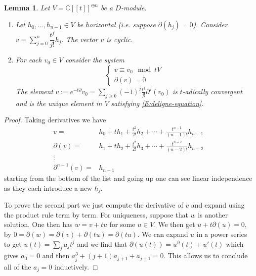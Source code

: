 \documentclass[]{book}
\numberwithin{equation}{section}
\newtheorem{lemma}[theorem]{Lemma}
\theoremstyle{definition}
\theoremstyle{remark}
\newcommand{\CC}{\mathbb{C}}
\begin{document}
\begin{lemma}\label{L:katz}
	Let $V=\CC[[t]]^{\oplus n}$ be a $D$-module. 
	\begin{enumerate}
		\item Let $h_0,\ldots,h_{n-1} \in V$ be horizontal (i.e. suppose $\partial(h_j)=0$). 
		Consider  $v=\sum_{j=0}^n \dfrac{t^j}{j!}h_j.$
		The vector $v$ is cyclic. 
		\item For each $v_0\in V$ consider the system 
		\begin{equation}\label{E:deligne-equation}
		\begin{cases}
		v \equiv v_0 \mod tV \\
		\partial(v) =0 
		\end{cases}
		\end{equation}
		The element  $v:= e^{-t\partial}v_0 = \sum_{j\geq 0}(-1)^j \frac{t^j}{j!}\partial^j(v_0)$
		is $t$-adically convergent and is the unique element in $V$ satisfying \eqref{E:deligne-equation}.
	\end{enumerate}
\end{lemma}
\begin{proof}
	Taking derivatives we have 
	\begin{align*}
	v=& h_0 + t h_1 + \frac{t^2}{2!} h_2 + \cdots + \frac{t^{n-1}}{(n-1)!}h_{n-1}\\
	\partial(v) =& h_1 + t h_2 + \frac{t^2}{2!} h_3+ \cdots + \frac{t^{n-2}}{(n-2)!}h_{n-2} \\
	\vdots & \\
	\partial^{n-1}(v) =& h_{n-1}
	\end{align*}
	starting from the bottom of the list and going up one can see linear independence as they each introduce a new $h_j$.
	
	To prove the second part we just compute the derivative of $v$ and expand using the product rule term by term. 
	For uniqueness, suppose that $w$ is another solution. 
	One then has $w=v+tu$ for some $u\in V$. 
	We then get $u+t\partial(u)=0$, by $0 = \partial(w) = \partial(v) + \partial(tu) = \partial(tu)$. 
	We can expand $u$ in a power series to get $u(t) = \sum_j a_j t^j$ and we find that $\partial(u(t)) = u^{\partial}(t) +u'(t)$ which gives $a_0=0$ and then $a_j^{\partial}+(j+1)a_{j+1} +a_{j+1}=0$. 
	This allows us to conclude all of the $a_j=0$ inductively. 
\end{proof}
\end{document}
